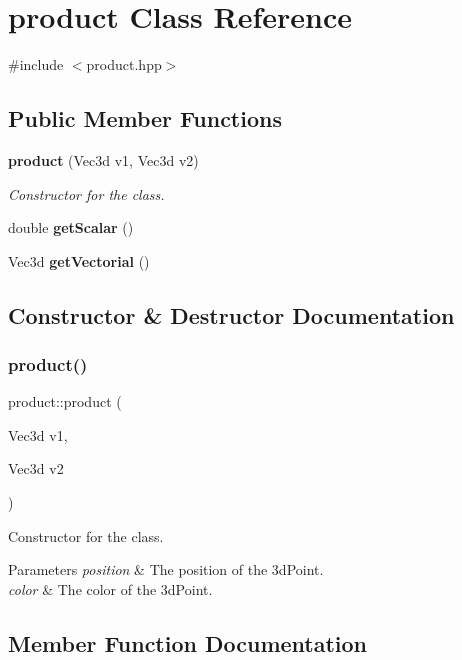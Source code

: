 \section{product Class Reference}
\label{classproduct}


{\ttfamily \#include $<$product.\+hpp$>$}

\subsection*{Public Member Functions}
\begin{DoxyCompactItemize}
\item 
\textbf{ product} (Vec3d v1, Vec3d v2)
\begin{DoxyCompactList}\small\item\em Constructor for the class. \end{DoxyCompactList}\item 
double \textbf{ get\+Scalar} ()
\item 
Vec3d \textbf{ get\+Vectorial} ()
\end{DoxyCompactItemize}


\subsection{Constructor \& Destructor Documentation}
\mbox{\label{classproduct_afb6d2aba360c4daeacef569a7e884689}} 
\subsubsection{product()}
{\footnotesize\ttfamily product\+::product (\begin{DoxyParamCaption}\item[{Vec3d}]{v1,  }\item[{Vec3d}]{v2 }\end{DoxyParamCaption})}



Constructor for the class. 


\begin{DoxyParams}{Parameters}
{\em position} & The position of the 3d\+Point. \\
\hline
{\em color} & The color of the 3d\+Point. \\
\hline
\end{DoxyParams}


\subsection{Member Function Documentation}
\mbox{\label{classproduct_a74c606ec2a03f632c6f86a5feac41834}} 
